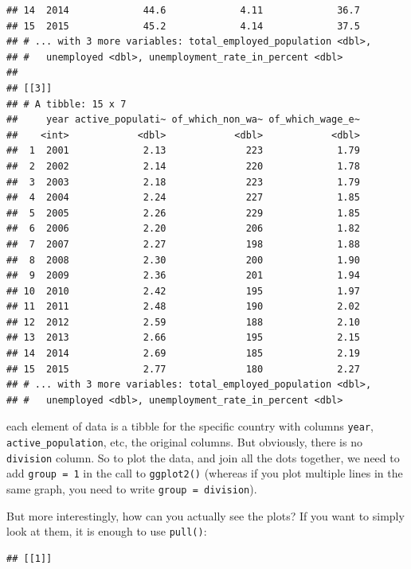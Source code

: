 \documentclass[]{gitbook}
\newenvironment{Shaded}{\begin{snugshade}}{\end{snugshade}}
\newcommand{\KeywordTok}[1]{\textcolor[rgb]{0.13,0.29,0.53}{\textbf{#1}}}
\newcommand{\NormalTok}[1]{#1}
\newcommand{\OperatorTok}[1]{\textcolor[rgb]{0.81,0.36,0.00}{\textbf{#1}}}
\newcommand{\StringTok}[1]{\textcolor[rgb]{0.31,0.60,0.02}{#1}}
\theoremstyle{definition}
\theoremstyle{definition}
\theoremstyle{definition}
\theoremstyle{remark}
\begin{document}
\begin{verbatim}
## 14  2014             44.6             4.11             36.7
## 15  2015             45.2             4.14             37.5
## # ... with 3 more variables: total_employed_population <dbl>,
## #   unemployed <dbl>, unemployment_rate_in_percent <dbl>
## 
## [[3]]
## # A tibble: 15 x 7
##     year active_populati~ of_which_non_wa~ of_which_wage_e~
##    <int>            <dbl>            <dbl>            <dbl>
##  1  2001             2.13              223             1.79
##  2  2002             2.14              220             1.78
##  3  2003             2.18              223             1.79
##  4  2004             2.24              227             1.85
##  5  2005             2.26              229             1.85
##  6  2006             2.20              206             1.82
##  7  2007             2.27              198             1.88
##  8  2008             2.30              200             1.90
##  9  2009             2.36              201             1.94
## 10  2010             2.42              195             1.97
## 11  2011             2.48              190             2.02
## 12  2012             2.59              188             2.10
## 13  2013             2.66              195             2.15
## 14  2014             2.69              185             2.19
## 15  2015             2.77              180             2.27
## # ... with 3 more variables: total_employed_population <dbl>,
## #   unemployed <dbl>, unemployment_rate_in_percent <dbl>
\end{verbatim}

each element of data is a tibble for the specific country with columns
\texttt{year}, \texttt{active\_population}, etc, the original columns.
But obviously, there is no \texttt{division} column. So to plot the
data, and join all the dots together, we need to add
\texttt{group\ =\ 1} in the call to \texttt{ggplot2()} (whereas if you
plot multiple lines in the same graph, you need to write
\texttt{group\ =\ division}).

But more interestingly, how can you actually see the plots? If you want
to simply look at them, it is enough to use \texttt{pull()}:

\begin{Shaded}
\end{Shaded}

\begin{verbatim}
## [[1]]
\end{verbatim}
\end{document}
